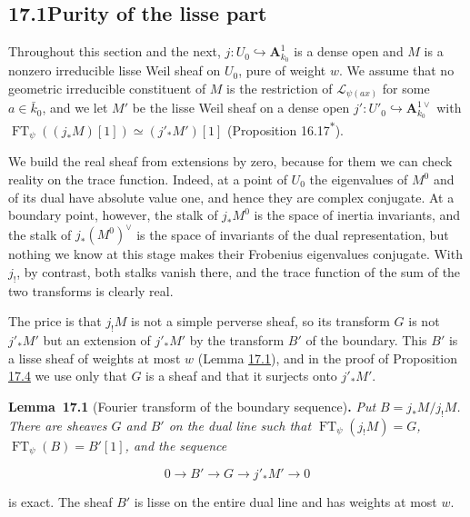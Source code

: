 \documentclass[11pt]{article}
\newenvironment{bpstatement}[2]{\par\addvspace{0.6\baselineskip}\noindent\textbf{#1}#2\textbf{.}\enspace\ignorespaces}
  {\par\addvspace{0.4\baselineskip}}
\newenvironment{bpstatementit}[2]{\begin{bpstatement}{#1}{#2}\itshape\ignorespaces}{\end{bpstatement}}
\newcommand{\bpout}[1]{#1\textsuperscript{\hyperlink{bp-outside}{\ensuremath{\ast}}}}
\begin{document}
\subsection*{\texorpdfstring{17.1\quad Purity of the lisse part}{17.1 Purity of the lisse part}}
\label{bp3}%
\label{bp4}%
Throughout this section and the next, \(j:U_0\hookrightarrow\mathbf A^1_{k_0}\) is a dense open and \(M\) is a nonzero irreducible lisse Weil sheaf on \(U_0\), pure of weight \(w\). We assume that no geometric irreducible constituent of \(M\) is the restriction of \(\mathcal L_{\psi(ax)}\) for some \(a\in\bar k_0\), and we let \(M'\) be the lisse Weil sheaf on a dense open \(j':U'_0\hookrightarrow\mathbf A^{1\vee}_{k_0}\) with \(\operatorname{FT}_\psi((j_*M)[1])\simeq(j'_*M')[1]\) (Proposition \bpout{16.17}).

We build the real sheaf from extensions by zero, because for them we can check reality on the trace function. Indeed, at a point of \(U_0\) the eigenvalues of \(M^0\) and of its dual have absolute value one, and hence they are complex conjugate. At a boundary point, however, the stalk of \(j_*M^0\) is the space of inertia invariants, and the stalk of \(j_*(M^0)^\vee\) is the space of invariants of the dual representation, but nothing we know at this stage makes their Frobenius eigenvalues conjugate. With \(j_!\), by contrast, both stalks vanish there, and the trace function of the sum of the two transforms is clearly real.

The price is that \(j_!M\) is not a simple perverse sheaf, so its transform \(G\) is not \(j'_*M'\) but an extension of \(j'_*M'\) by the transform \(B'\) of the boundary. This \(B'\) is a lisse sheaf of weights at most \(w\) (Lemma \hyperref[bp5]{17.1}), and in the proof of Proposition \hyperref[bp12]{17.4} we use only that \(G\) is a sheaf and that it surjects onto \(j'_*M'\).

\label{bp5}%
\begin{bpstatementit}{Lemma~17.1}{ (Fourier transform of the boundary sequence)}
Put \(B=j_*M/j_!M\). There are sheaves \(G\) and \(B'\) on the dual line such that \(\operatorname{FT}_\psi(j_!M)=G\), \(\operatorname{FT}_\psi(B)=B'[1]\), and the sequence

\[
0\longrightarrow B'\longrightarrow G
\longrightarrow j'_*M'\longrightarrow0
\]

is exact. The sheaf \(B'\) is lisse on the entire dual line and has weights at most \(w\).
\end{bpstatementit}
\end{document}
